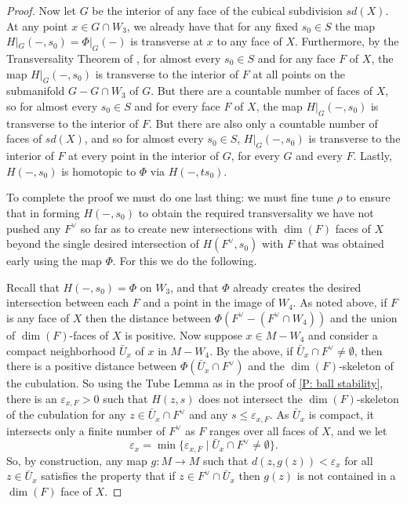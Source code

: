 \begin{proof}
	Now let $G$ be the interior of any face of the cubical subdivision $sd(X)$.
	At any point $x \in G \cap W_3$, we already have that for any fixed $s_0 \in S$ the map $H|_G(-,s_0) = \Phi|_G(-)$ is transverse at $x$ to any face of $X$.
	Furthermore, by the Transversality Theorem of \cite{GuPo74}, for almost every $s_0 \in S$ and for any face $F$ of $X$, the map $H|_G(-,s_0)$ is transverse to the interior of $F$ at all points on the submanifold $G-G \cap W_3$ of $G$.
	But there are a countable number of faces of $X$, so for almost every $s_0 \in S$ and for every face $F$ of $X$, the map $H|_G(-,s_0)$ is transverse to the interior of $F$.
	But there are also only a countable number of faces of $sd(X)$, and so for almost every $s_0 \in S$, $H|_G(-,s_0)$ is transverse to the interior of $F$ at every point in the interior of $G$, for every $G$ and every $F$.
	Lastly, $H(-,s_0)$ is homotopic to $\Phi$ via $H(-, ts_0)$.

	To complete the proof we must do one last thing: we must fine tune $\rho$ to ensure that in forming $H(-,s_0)$ to obtain the required transversality we have not pushed any $F^\vee$ so far as to create new intersections with $\dim(F)$ faces of $X$ beyond the single desired intersection of $H(F^\vee,s_0)$ with $F$ that was obtained early using the map $\Phi$.
	For this we do the following.

	Recall that $H(-,s_0) = \Phi$ on $W_3$, and that $\Phi$ already creates the desired intersection between each $F$ and a point in the image of $W_4$.
	As noted above, if $F$ is any face of $X$ then the distance between $\Phi(F^\vee-(F^\vee \cap W_4))$ and the union of $\dim(F)$-faces of $X$ is positive.
	Now suppose $x \in M-W_4$ and consider a compact neighborhood $\bar U_x$ of $x$ in $M-W_4$.
	By the above, if $\bar U_x \cap F^\vee \neq \emptyset$, then there is a positive distance between $\Phi(\bar U_x \cap F^\vee)$ and the $\dim(F)$-skeleton of the cubulation.
	So using the Tube Lemma as in the proof of \cref{P: ball stability}, there is an $\varepsilon_{x,F} > 0$ such that $H(z,s)$ does not intersect the $\dim(F)$-skeleton of the cubulation for any $z \in \bar U_x \cap F^\vee$ and any $s \leq \varepsilon_{x,F}$.
	As $\bar U_x$ is compact, it intersects only a finite number of $F^\vee$ as $F$ ranges over all faces of $X$, and we let $$\varepsilon_x = \min\{\varepsilon_{x,F} \mid \bar U_x \cap F^\vee\neq \emptyset\}.$$
	So, by construction, any map $g \colon M \to M$ such that $d(z,g(z))<\varepsilon_x$ for all $z \in \bar U_x$ satisfies the property that if $z \in F^\vee \cap \bar U_x$ then $g(z)$ is not contained in a $\dim(F)$ face of $X$.


\end{proof}

